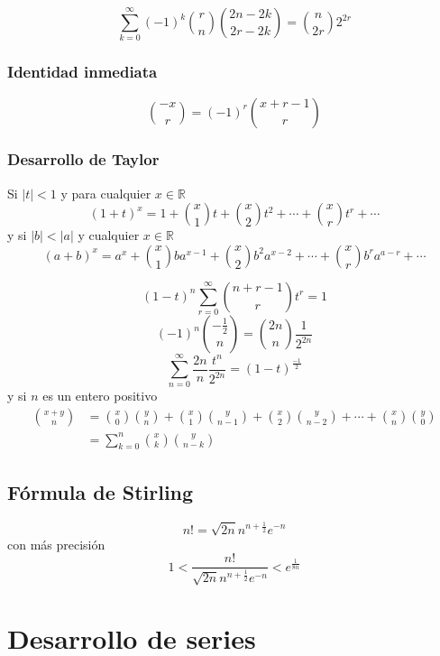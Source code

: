 \[
\sum_{k=0}^\infty (-1)^k \binom{r}{n} \binom{2n-2k}{2r-2k} = \binom{n}{2r}2^{2r}
\]

\subsection{Identidad inmediata}

\[
  \binom{-x}{r} = (-1)^r\binom{x+r-1}{r}
\] 

\subsection{Desarrollo de Taylor} 

Si \(|t|<1\) y para cualquier
\(x \in \mathbb{R}\) \[
  (1+t)^x=1 + \binom{x}{1}t + \binom{x}{2}t^2 + \cdots + \binom{x}{r}t^r+\cdots
\] y si \(|b| < |a|\) y cualquier \(x \in \mathbb{R}\) \[
  (a+b)^x=a^x + \binom{x}{1}ba^{x-1} + \binom{x}{2}b^2a^{x-2} + \cdots + \binom{x}{r}b^ra^{a-r}+\cdots
\]

\[
  (1-t)^n\sum_{r=0}^\infty \binom{n+r-1}{r}t^r=1
\] \[
  (-1)^n\binom{-\frac{1}{2}}{n}=\binom{2n}{n}\frac{1}{2^{2n}}
\] \[
  \sum_{n=0}^\infty \frac{2n}{n}\frac{t^n}{2^{2n}}=(1-t)^{\frac{-1}{2}}
\] y si \(n\) es un entero positivo 
\begin{align*}
	  \binom{x+y}{n}&=\binom{x}{0}\binom{y}{n}+\binom{x}{1}\binom{y}{n-1}+\binom{x}{2}\binom{y}{n-2}+\cdots+\binom{x}{n}\binom{y}{0}\\
	&=\sum_{k=0}^n \binom{x}{k}\binom{y}{n-k}
\end{align*}

\section{Fórmula de Stirling} 
\[
  n! = \sqrt{2n}n^{n+\frac{1}{2}}e^{-n}
\] con más precisión \[
  1 < \frac{n!}{\sqrt{2n}n^{n+\frac{1}{2}}e^{-n}} < e^{\frac{1}{8n}}
\]

\chapter*{Desarrollo de series}

